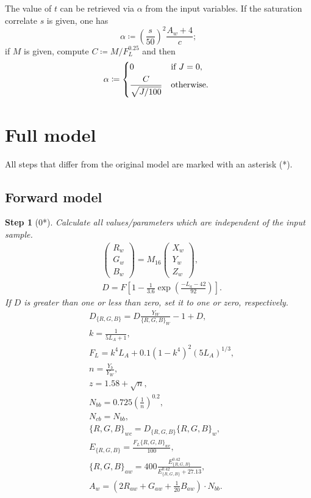 \documentclass[twocolumn]{scrartcl}
\theoremstyle{named}
\newtheorem*{step}{Step}
\begin{document}
The value of $t$ can be retrieved via $\alpha$ from the input variables.
If the saturation correlate $s$ is given, one has
\[
  \alpha \coloneqq {\left(\frac{s}{50}\right)}^2 \frac{A_w+4}{c};
\]
if $M$ is given, compute $C\coloneqq M / F_L^{0.25}$ and then
\[
\alpha\coloneqq\begin{dcases*}
  0 &if $J=0$,\\
  \frac{C}{\sqrt{J/100}}&otherwise.
\end{dcases*}\]



\section{Full model}

All steps that differ from the original model are marked with an asterisk (*).

\subsection{Forward model}

\begin{step}[0*]
Calculate all values/parameters which are independent
of the input sample.
\begin{align*}
  &\begin{pmatrix}R_w\\G_w\\B_w\end{pmatrix}
    = M_{16}
  \begin{pmatrix}X_w\\Y_w\\Z_w\end{pmatrix},\\
  &D = F \left[1 - \tfrac{1}{3.6} \exp\left(\tfrac{-L_a-42}{92}\right)\right].
\end{align*}
If $D$ is greater than one or less than zero, set it to one or zero,
respectively.
\begin{align*}
  &D_{\{R,G,B\}} = D\frac{Y_W}{{\{R,G,B\}}_W} -1 + D,\\
  &k = \frac{1}{5L_A + 1},\\
  &F_L = k^4 L_A + 0.1 {(1-k^4)}^2 {(5L_A)}^{1/3},\\
  &n = \frac{Y_b}{Y_W},\\
  &z = 1.58 + \sqrt{n},\\
  &N_{bb} = 0.725 {\left(\frac{1}{n}\right)}^{0.2},\\
  &N_{cb} = N_{bb},\\
  &{\{R,G,B\}}_{wc} = D_{\{R, G, B\}} {\{R, G, B\}}_w,\\
  &E_{\{R,G,B\}} = \frac{F_L {\{R,G,B\}}_{wc}}{100},\\
  &{\{R,G,B\}}_{aw} = 400
  \frac{E_{\{R,G,B\}}^{0.42}}{E_{\{R,G,B\}}^{0.42} + 27.13},\\
  &A_w = \left(2R_{aw} + G_{aw} + \tfrac{1}{20} B_{aw}\right) \cdot N_{bb}.
\end{align*}
\end{step}
\end{document}
